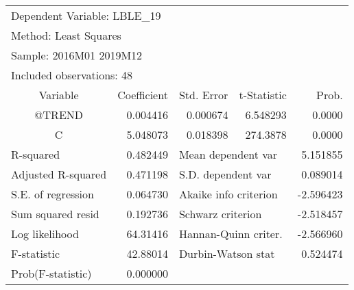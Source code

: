 \begin{tabular}{lrrrr}
\toprule
\multicolumn{2}{l}{Dependent Variable: LBLE\_19}&\multicolumn{1}{c}{}&\multicolumn{1}{c}{}&\multicolumn{1}{c}{}\\
\multicolumn{2}{l}{Method: Least Squares}&\multicolumn{1}{c}{}&\multicolumn{1}{c}{}&\multicolumn{1}{c}{}\\
\multicolumn{2}{l}{Sample: 2016M01 2019M12}&\multicolumn{1}{c}{}&\multicolumn{1}{c}{}&\multicolumn{1}{c}{}\\
\multicolumn{2}{l}{Included observations: 48}&\multicolumn{1}{c}{}&\multicolumn{1}{c}{}&\multicolumn{1}{c}{}\\
\midrule
\multicolumn{1}{c}{Variable}&\multicolumn{1}{r}{Coefficient}&\multicolumn{1}{r}{Std. Error}&\multicolumn{1}{r}{t-Statistic}&\multicolumn{1}{r}{Prob.}\\
\midrule
\multicolumn{1}{c}{@TREND}&\multicolumn{1}{r}{0.004416}&\multicolumn{1}{r}{0.000674}&\multicolumn{1}{r}{6.548293}&\multicolumn{1}{r}{0.0000}\\
\multicolumn{1}{c}{C}&\multicolumn{1}{r}{5.048073}&\multicolumn{1}{r}{0.018398}&\multicolumn{1}{r}{274.3878}&\multicolumn{1}{r}{0.0000}\\
\midrule
\multicolumn{1}{l}{R-squared}&\multicolumn{1}{r}{0.482449}&\multicolumn{2}{l}{Mean dependent var}&\multicolumn{1}{r}{5.151855}\\
\multicolumn{1}{l}{Adjusted R-squared}&\multicolumn{1}{r}{0.471198}&\multicolumn{2}{l}{S.D. dependent var}&\multicolumn{1}{r}{0.089014}\\
\multicolumn{1}{l}{S.E. of regression}&\multicolumn{1}{r}{0.064730}&\multicolumn{2}{l}{Akaike info criterion}&\multicolumn{1}{r}{-2.596423}\\
\multicolumn{1}{l}{Sum squared resid}&\multicolumn{1}{r}{0.192736}&\multicolumn{2}{l}{Schwarz criterion}&\multicolumn{1}{r}{-2.518457}\\
\multicolumn{1}{l}{Log likelihood}&\multicolumn{1}{r}{64.31416}&\multicolumn{2}{l}{Hannan-Quinn criter.}&\multicolumn{1}{r}{-2.566960}\\
\multicolumn{1}{l}{F-statistic}&\multicolumn{1}{r}{42.88014}&\multicolumn{2}{l}{Durbin-Watson stat}&\multicolumn{1}{r}{0.524474}\\
\multicolumn{1}{l}{Prob(F-statistic)}&\multicolumn{1}{r}{0.000000}&\multicolumn{1}{c}{}&\multicolumn{1}{c}{}&\multicolumn{1}{c}{}\\
\bottomrule
\end{tabular}
